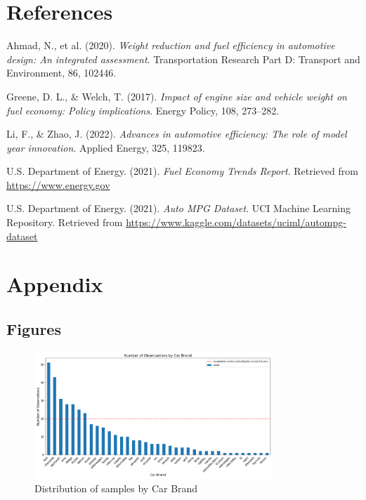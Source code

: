 \documentclass[12pt]{article}
\begin{document}
\section{References}
\begin{thebibliography}{9}

Ahmad, N., et al. (2020). \textit{Weight reduction and fuel efficiency in automotive design: An integrated assessment}. Transportation Research Part D: Transport and Environment, 86, 102446.

Greene, D. L., \& Welch, T. (2017). \textit{Impact of engine size and vehicle weight on fuel economy: Policy implications}. Energy Policy, 108, 273–282.

Li, F., \& Zhao, J. (2022). \textit{Advances in automotive efficiency: The role of model year innovation}. Applied Energy, 325, 119823.

U.S. Department of Energy. (2021). \textit{Fuel Economy Trends Report}. Retrieved from \url{https://www.energy.gov}

U.S. Department of Energy. (2021). \textit{Auto MPG Dataset}. 
UCI Machine Learning Repository. Retrieved from \url{https://www.kaggle.com/datasets/uciml/autompg-dataset}

\end{thebibliography}

\section{Appendix}

\subsection{Figures}
\begin{figure}[!h]
    \centering
    \includegraphics[width=0.8\textwidth]{../results/brand_distribution.png}
    \caption{Distribution of samples by Car Brand}
    \label{fig:brand_distribution}
\end{figure}
\end{document}
